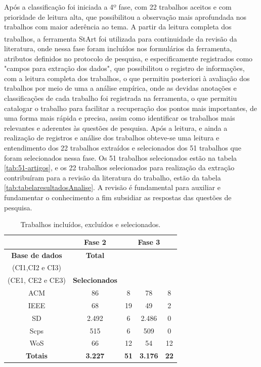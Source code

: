 Após a classificação foi iniciada a 4º fase, com 22 trabalhos aceitos e com prioridade de leitura alta, que possibilitou a observação mais aprofundada nos trabalhos com maior aderência ao tema. A partir da leitura completa dos trabalhos, a ferramenta \acrshort{StArt}\textsuperscript{\textregistered} foi utilizada para continuidade da revisão da literatura, onde nessa fase foram incluídos nos formulários da ferramenta, atributos definidos no protocolo de pesquisa, e especificamente registrados como "campos para extração dos dados", que possibilitou o registro de informações, com a leitura completa dos trabalhos, o  que permitiu posteriori à avaliação dos trabalhos por meio de uma a análise empírica, onde as devidas anotações e classificações de cada trabalho foi registrada na ferramenta, o que permitiu catalogar o trabalho para facilitar a recuperação dos pontos mais importantes, de uma forma mais rápida e precisa, assim como identificar os trabalhos mais relevantes e aderentes às questões de pesquisa. Após a leitura, e ainda a realização de registros e análise dos trabalhos obteve-se uma leitura e entendimento dos 22 trabalhos extraídos e selecionados dos 51 trabalhos que foram selecionados nessa fase. Os 51 trabalhos selecionados estão na tabela \ref{tab:51-artigos}, e os 22 trabalhos selecionados para  realização da extração contribuíram para a revisão da literatura do trabalho, estão da tabela \ref{tab:tabelaresultadosAnalise}. A revisão é fundamental para auxiliar e fundamentar o conhecimento a fim subsidiar as respostas das questões de pesquisa. 

\begin{longtable}{c|c|c|c|c|}
\caption{Trabalhos incluídos, excluídos e selecionados.}
\label{tab:fase-revisao-literatura}\\
\cline{2-5}
 & \textbf{Fase 2} & \multicolumn{3}{c|}{\textbf{Fase 3}} \\ \hline
\endfirsthead
%
\endhead
%
\multicolumn{1}{|c|}{\textbf{Base de dados}} & \textbf{Total} & \textbf{\begin{tabular}[c]{@{}c@{}}Incluídos\\ (CI1,CI2 e CI3)\end{tabular}} & \textbf{\begin{tabular}[c]{@{}c@{}}Excluídos\\ (CE1, CE2 e CE3)\end{tabular}} & \textbf{Selecionados} \\ \hline
\multicolumn{1}{|c|}{\acrlong{ACM}} & 86 & 8 & 78 & 8 \\ \hline
\multicolumn{1}{|c|}{\acrlong{IEEE}} & 68 & 19 & 49 & 2 \\ \hline
\multicolumn{1}{|c|}{\acrlong{SD}} & 2.492 & 6 & 2.486 & 0 \\ \hline
\multicolumn{1}{|c|}{\acrlong{Scps}} & 515 & 6 & 509 & 0 \\ \hline
\multicolumn{1}{|c|}{\acrlong{WoS}} & 66 & 12 & 54 & 12 \\ \hline
\multicolumn{1}{|c|}{\textbf{Totais}} & \textbf{‭3.227‬} & \textbf{51} & \textbf{3.176} & \textbf{22} \\ \hline
\end{longtable}


